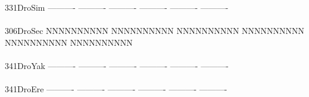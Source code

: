 \documentclass[11pt,twoside,reqno,a4paper]{article}
\begin{document}
{331\hspace*{1\charwidth}DroSim	----------	----------	----------	----------	----------	----------	\\
\hspace*{4\charwidth}\hspace*{7\charwidth}\hspace*{1\charwidth}\hspace*{1\charwidth}\hspace*{1\charwidth}\hspace*{1\charwidth}\hspace*{1\charwidth}\hspace*{1\charwidth}\\
306\hspace*{1\charwidth}DroSec	NNNNNNNNNN	NNNNNNNNNN	NNNNNNNNNN	NNNNNNNNNN	NNNNNNNNNN	NNNNNNNNNN	\\
\hspace*{4\charwidth}\hspace*{7\charwidth}\hspace*{1\charwidth}\hspace*{1\charwidth}\hspace*{1\charwidth}\hspace*{1\charwidth}\hspace*{1\charwidth}\hspace*{1\charwidth}\\
341\hspace*{1\charwidth}DroYak	----------	----------	----------	----------	----------	----------	\\
\hspace*{4\charwidth}\hspace*{7\charwidth}\hspace*{1\charwidth}\hspace*{1\charwidth}\hspace*{1\charwidth}\hspace*{1\charwidth}\hspace*{1\charwidth}\hspace*{1\charwidth}\\
341\hspace*{1\charwidth}DroEre	----------	----------	----------	----------	----------	----------	\\
\hspace*{4\charwidth}\hspace*{7\charwidth}\hspace*{1\charwidth}\hspace*{1\charwidth}\hspace*{1\charwidth}\hspace*{1\charwidth}\hspace*{1\charwidth}\hspace*{1\charwidth}\\
}
\end{document}
